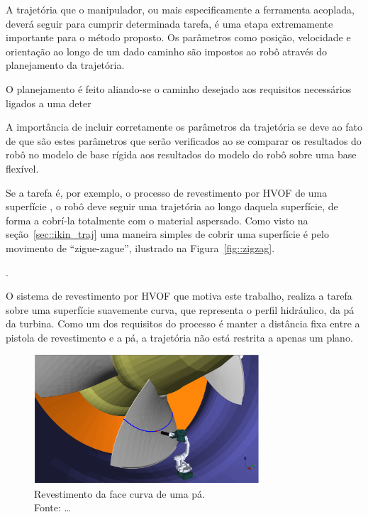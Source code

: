 A trajetória que o manipulador, ou mais especificamente a ferramenta acoplada,
deverá seguir para cumprir determinada tarefa, é uma etapa extremamente
importante para o método proposto. Os parâmetros como posição, velocidade e
orientação ao longo de um dado caminho são impostos ao robô através do
planejamento da trajetória. 

O planejamento é feito aliando-se o caminho desejado aos requisitos necessários
ligados a uma deter

A importância de incluir corretamente os parâmetros da trajetória se
deve ao fato de que são estes parâmetros que serão verificados ao se comparar
os resultados do robô no modelo de base rígida aos resultados do modelo do robô
sobre uma base flexível. 

Se a tarefa é, por exemplo, o processo de revestimento por HVOF de uma
superfície , o robô deve seguir uma trajetória ao longo daquela superfície, de
forma a cobrí-la totalmente com o material aspersado. Como visto na
seção~\ref{sec::ikin_traj} uma maneira simples de cobrir uma superfície é pelo
movimento de ``zigue-zague'', ilustrado
na Figura~\ref{fig::zigzag}.

.

O sistema de revestimento por HVOF que motiva este trabalho, realiza a tarefa
sobre uma superfície suavemente curva, que representa o perfil hidráulico, da pá
da turbina. Como um dos requisitos do processo é manter a distância fixa entre a
pistola de revestimento e a pá, a trajetória não está restrita a apenas um
plano.

\begin{figure}[h]
	\centering 
 	\includegraphics[width=0.75\textwidth]{figs/coat_blade}
 	\caption[Revestimento da face curva de uma pá]{Revestimento da face curva de
 	uma pá. \\Fonte: \ldots}
 	\label{fig::trajec_600x30}
\end{figure}

